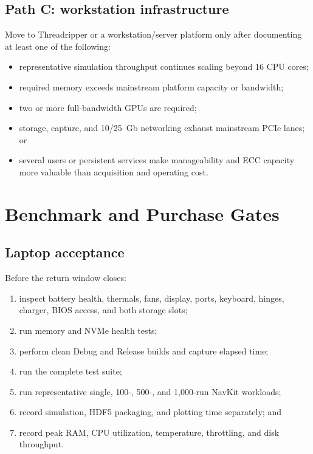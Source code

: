 \documentclass[11pt]{article}
\begin{document}
\subsection{Path C: workstation infrastructure}

Move to Threadripper or a workstation/server platform only after documenting at
least one of the following:

\begin{itemize}
  \item representative simulation throughput continues scaling beyond 16 CPU cores;
  \item required memory exceeds mainstream platform capacity or bandwidth;
  \item two or more full-bandwidth GPUs are required;
  \item storage, capture, and 10/25~Gb networking exhaust mainstream PCIe lanes; or
  \item several users or persistent services make manageability and ECC capacity
        more valuable than acquisition and operating cost.
\end{itemize}

\section{Benchmark and Purchase Gates}

\subsection{Laptop acceptance}

Before the return window closes:

\begin{enumerate}
  \item inspect battery health, thermals, fans, display, ports, keyboard, hinges,
        charger, BIOS access, and both storage slots;
  \item run memory and NVMe health tests;
  \item perform clean Debug and Release builds and capture elapsed time;
  \item run the complete test suite;
  \item run representative single, 100-, 500-, and 1,000-run NavKit workloads;
  \item record simulation, HDF5 packaging, and plotting time separately; and
  \item record peak RAM, CPU utilization, temperature, throttling, and disk throughput.
\end{enumerate}
\end{document}
